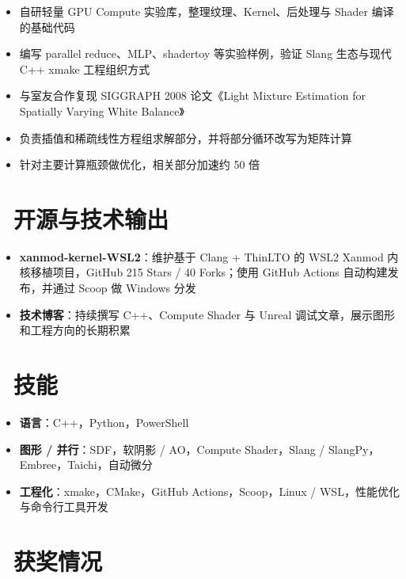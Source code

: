\documentclass{resume}
\begin{document}
\begin{onehalfspacing}
\begin{itemize}
  \item 自研轻量 GPU Compute 实验库，整理纹理、Kernel、后处理与 Shader 编译的基础代码
  \item 编写 parallel reduce、MLP、shadertoy 等实验样例，验证 Slang 生态与现代 C++ xmake 工程组织方式
\end{itemize}
\end{onehalfspacing}

\begin{onehalfspacing}
\begin{itemize}
  \item 与室友合作复现 SIGGRAPH 2008 论文《Light Mixture Estimation for Spatially Varying White Balance》
  \item 负责插值和稀疏线性方程组求解部分，并将部分循环改写为矩阵计算
  \item 针对主要计算瓶颈做优化，相关部分加速约 50 倍
\end{itemize}
\end{onehalfspacing}

\section{\faGithub\ 开源与技术输出}
\begin{itemize}[parsep=0.5ex]
  \item \textbf{xanmod-kernel-WSL2}：维护基于 Clang + ThinLTO 的 WSL2 Xanmod 内核移植项目，GitHub 215 Stars / 40 Forks；使用 GitHub Actions 自动构建发布，并通过 Scoop 做 Windows 分发
  \item \textbf{技术博客}：持续撰写 C++、Compute Shader 与 Unreal 调试文章，展示图形和工程方向的长期积累
\end{itemize}

\section{\faCogs\ 技能}
\begin{itemize}[parsep=0.5ex]
  \item \textbf{语言}：C++，Python，PowerShell
  \item \textbf{图形 / 并行}：SDF，软阴影 / AO，Compute Shader，Slang / SlangPy，Embree，Taichi，自动微分
  \item \textbf{工程化}：xmake，CMake，GitHub Actions，Scoop，Linux / WSL，性能优化与命令行工具开发
\end{itemize}

\section{\faHeartO\ 获奖情况}
\end{document}
